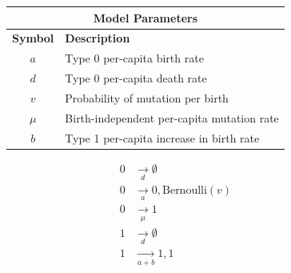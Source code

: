 \documentclass{article}
\numberwithin{equation}{section}
\begin{document}
\begin{figure}[H]
    \centering 

    \begin{minipage}{0.45\textwidth}
        \centering
        \renewcommand{\arraystretch}{1.2}
        \begin{tabular}{cl}
            \hline\hline
            \multicolumn{2}{c}{\textbf{Model Parameters}} \\
            \hline
            \textbf{Symbol} & \textbf{Description}      \\
            \hline
            $a$           & Type 0 per-capita birth rate    \\
            $d$           & Type 0 per-capita death rate     \\
            $v$             & Probability of mutation per birth     \\
            $\mu$           & Birth-independent per-capita mutation rate   \\
            $b$             & Type 1 per-capita increase in birth rate   \\
            \hline\hline
        \end{tabular}
    \end{minipage}
    \hfill 
    \begin{minipage}{0.45\textwidth}
        \begin{align*}
            0&\underset{d}{\to}\emptyset\\
            0&\underset{a}{\to}0,\text{Bernoulli}(v)\\
            0&\underset{\mu}{\to}1\\
            1&\underset{d}{\to}\emptyset\\
            1&\underset{a+b}{\to}1,1
        \end{align*}
    \end{minipage}


\end{figure}
\end{document}
